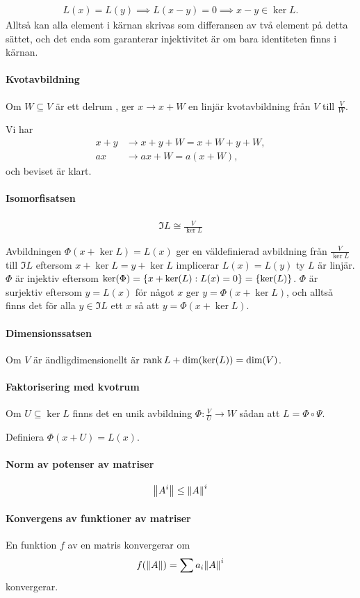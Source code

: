 \proof
\begin{align*}
	L(x) = L(y)\implies L(x - y) = 0\implies x - y\in\ker{L}.
\end{align*}
Alltså kan alla element i kärnan skrivas som differansen av två element på detta sättet, och det enda som garanterar injektivitet är om bara identiteten finns i kärnan.

\paragraph{Kvotavbildning}
Om $W\subseteq V$ är ett delrum , ger $x\to x + W$ en linjär kvotavbildning från $V$ till $\frac{V}{W}$.

\proof
Vi har
\begin{align*}
	x + y &\to x + y + W = x + W + y + W, \\
	ax    &\to ax + W = a(x + W),
\end{align*}
och beviset är klart.

\paragraph{Isomorfisatsen}
\begin{align*}
	\Im{L} \cong \frac{V}{\ker{L}}
\end{align*}

\proof
Avbildningen $\Phi(x + \ker{L}) = L(x)$ ger en väldefinierad avbildning från $\frac{V}{\ker{L}}$ till $\Im{L}$ eftersom $x + \ker{L} = y + \ker{L}$ implicerar $L(x) = L(y)$ ty $L$ är linjär. $\Phi$ är injektiv eftersom $\ker{\Phi} = \set{x + \ker{L}}{L(x) = 0} = \set{\ker{L}}{}$. $\Phi$ är surjektiv eftersom $y = L(x)$ för något $x$ ger $y = \Phi(x + \ker{L})$, och alltså finns det för alla $y\in\Im{L}$ ett $x$ så att $y = \Phi(x + \ker{L})$.

\paragraph{Dimensionssatsen}
Om $V$ är ändligdimensionellt är $\rank{L} + \text{dim}(\text{ker}(L)) = \text{dim}(V)$.

\proof

\paragraph{Faktorisering med kvotrum}
Om $U\subseteq\ker{L}$ finns det en unik avbildning $\Phi: \frac{V}{U}\to W$ sådan att $L = \Phi\circ\Psi$.

\proof
Definiera $\Phi(x + U) = L(x)$.

\paragraph{Norm av potenser av matriser}
\begin{align*}
	\norm{A^{i}}\leq \norm{A}^{i}
\end{align*}

\proof

\paragraph{Konvergens av funktioner av matriser}
En funktion $f$ av en matris konvergerar om
\begin{align*}
	f(\norm{A}) = \sum a_{i}\norm{A}^{i}
\end{align*}
konvergerar.